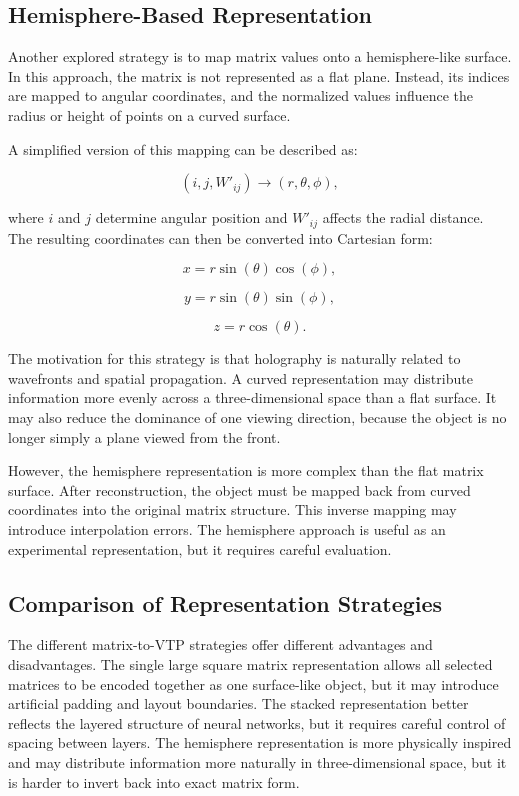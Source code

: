 \documentclass{article}
\begin{document}
\begin{normalsize}
\subsection{Hemisphere-Based Representation}

Another explored strategy is to map matrix values onto a hemisphere-like surface. In this approach, the matrix is not represented as a flat plane. Instead, its indices are mapped to angular coordinates, and the normalized values influence the radius or height of points on a curved surface.

A simplified version of this mapping can be described as:

\[
(i,j,W'_{ij}) \rightarrow (r,\theta,\phi),
\]

where \(i\) and \(j\) determine angular position and \(W'_{ij}\) affects the radial distance. The resulting coordinates can then be converted into Cartesian form:

\[
x = r \sin(\theta)\cos(\phi),
\]

\[
y = r \sin(\theta)\sin(\phi),
\]

\[
z = r \cos(\theta).
\]

The motivation for this strategy is that holography is naturally related to wavefronts and spatial propagation. A curved representation may distribute information more evenly across a three-dimensional space than a flat surface. It may also reduce the dominance of one viewing direction, because the object is no longer simply a plane viewed from the front.

However, the hemisphere representation is more complex than the flat matrix surface. After reconstruction, the object must be mapped back from curved coordinates into the original matrix structure. This inverse mapping may introduce interpolation errors. The hemisphere approach is useful as an experimental representation, but it requires careful evaluation.

\subsection{Comparison of Representation Strategies}

The different matrix-to-VTP strategies offer different advantages and disadvantages. The single large square matrix representation allows all selected matrices to be encoded together as one surface-like object, but it may introduce artificial padding and layout boundaries. The stacked representation better reflects the layered structure of neural networks, but it requires careful control of spacing between layers. The hemisphere representation is more physically inspired and may distribute information more naturally in three-dimensional space, but it is harder to invert back into exact matrix form.


\end{normalsize}
\end{document}
